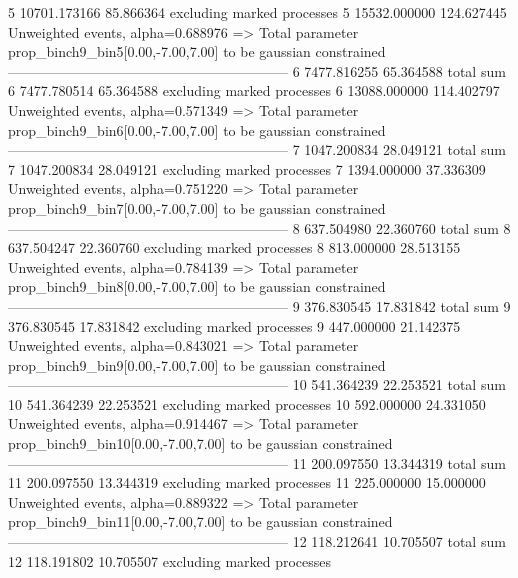 5          10701.173166    85.866364       excluding marked processes    
5          15532.000000    124.627445      Unweighted events, alpha=0.688976
  => Total parameter prop_binch9_bin5[0.00,-7.00,7.00] to be gaussian constrained
------------------------------------------------------------
6          7477.816255     65.364588       total sum                     
6          7477.780514     65.364588       excluding marked processes    
6          13088.000000    114.402797      Unweighted events, alpha=0.571349
  => Total parameter prop_binch9_bin6[0.00,-7.00,7.00] to be gaussian constrained
------------------------------------------------------------
7          1047.200834     28.049121       total sum                     
7          1047.200834     28.049121       excluding marked processes    
7          1394.000000     37.336309       Unweighted events, alpha=0.751220
  => Total parameter prop_binch9_bin7[0.00,-7.00,7.00] to be gaussian constrained
------------------------------------------------------------
8          637.504980      22.360760       total sum                     
8          637.504247      22.360760       excluding marked processes    
8          813.000000      28.513155       Unweighted events, alpha=0.784139
  => Total parameter prop_binch9_bin8[0.00,-7.00,7.00] to be gaussian constrained
------------------------------------------------------------
9          376.830545      17.831842       total sum                     
9          376.830545      17.831842       excluding marked processes    
9          447.000000      21.142375       Unweighted events, alpha=0.843021
  => Total parameter prop_binch9_bin9[0.00,-7.00,7.00] to be gaussian constrained
------------------------------------------------------------
10         541.364239      22.253521       total sum                     
10         541.364239      22.253521       excluding marked processes    
10         592.000000      24.331050       Unweighted events, alpha=0.914467
  => Total parameter prop_binch9_bin10[0.00,-7.00,7.00] to be gaussian constrained
------------------------------------------------------------
11         200.097550      13.344319       total sum                     
11         200.097550      13.344319       excluding marked processes    
11         225.000000      15.000000       Unweighted events, alpha=0.889322
  => Total parameter prop_binch9_bin11[0.00,-7.00,7.00] to be gaussian constrained
------------------------------------------------------------
12         118.212641      10.705507       total sum                     
12         118.191802      10.705507       excluding marked processes    
